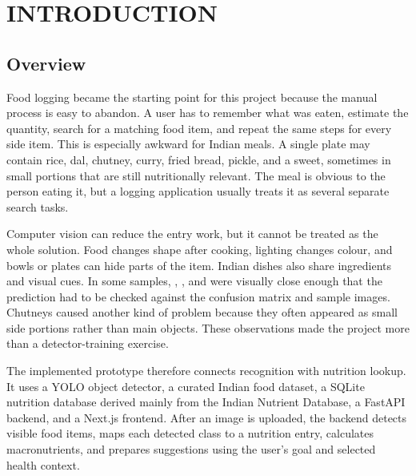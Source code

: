 \chapter{INTRODUCTION}

\section{Overview}

Food logging became the starting point for this project because the manual process is easy to abandon. A user has to remember what was eaten, estimate the quantity, search for a matching food item, and repeat the same steps for every side item. This is especially awkward for Indian meals. A single plate may contain rice, dal, chutney, curry, fried bread, pickle, and a sweet, sometimes in small portions that are still nutritionally relevant. The meal is obvious to the person eating it, but a logging application usually treats it as several separate search tasks.

Computer vision can reduce the entry work, but it cannot be treated as the whole solution. Food changes shape after cooking, lighting changes colour, and bowls or plates can hide parts of the item. Indian dishes also share ingredients and visual cues. In some samples, , , and  were visually close enough that the prediction had to be checked against the confusion matrix and sample images. Chutneys caused another kind of problem because they often appeared as small side portions rather than main objects. These observations made the project more than a detector-training exercise.

The implemented prototype therefore connects recognition with nutrition lookup. It uses a YOLO object detector, a curated Indian food dataset, a SQLite nutrition database derived mainly from the Indian Nutrient Database, a FastAPI backend, and a Next.js frontend. After an image is uploaded, the backend detects visible food items, maps each detected class to a nutrition entry, calculates macronutrients, and prepares suggestions using the user's goal and selected health context.

